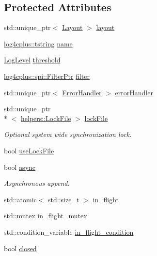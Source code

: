 \subsection*{Protected Attributes}
\begin{DoxyCompactItemize}
\item 
std\-::unique\-\_\-ptr$<$ \hyperlink{classlog4cplus_1_1Layout}{Layout} $>$ \hyperlink{classlog4cplus_1_1Appender_a54860ac05a751b1c3537458edc57b84a}{layout}
\item 
\hyperlink{namespacelog4cplus_a3c9287f6ebcddc50355e29d71152117b}{log4cplus\-::tstring} \hyperlink{classlog4cplus_1_1Appender_a7396e57f462275efb5c4050ef76230b2}{name}
\item 
\hyperlink{namespacelog4cplus_abd332cc8c98fefcbbdcf57b6b3867de9}{Log\-Level} \hyperlink{classlog4cplus_1_1Appender_ac5c52f4dd571d2347a8ec7fc9aa7cedd}{threshold}
\item 
\hyperlink{namespacelog4cplus_1_1spi_abfdea757523ce8fe4598502a29bc7545}{log4cplus\-::spi\-::\-Filter\-Ptr} \hyperlink{classlog4cplus_1_1Appender_a1eb5991691361dac62811a506b158bb7}{filter}
\item 
std\-::unique\-\_\-ptr$<$ \hyperlink{classlog4cplus_1_1ErrorHandler}{Error\-Handler} $>$ \hyperlink{classlog4cplus_1_1Appender_a4a177c2a1ad2aa5945aeac1bd83cfc84}{error\-Handler}
\item 
std\-::unique\-\_\-ptr\\*
$<$ \hyperlink{classlog4cplus_1_1helpers_1_1LockFile}{helpers\-::\-Lock\-File} $>$ \hyperlink{classlog4cplus_1_1Appender_aba357bf52f47fa29747015e421ce6c92}{lock\-File}
\begin{DoxyCompactList}\small\item\em Optional system wide synchronization lock. \end{DoxyCompactList}\item 
bool \hyperlink{classlog4cplus_1_1Appender_a448f8d2e3bf631b1c557e1da8f58fbbb}{use\-Lock\-File}
\item 
bool \hyperlink{classlog4cplus_1_1Appender_a17fc7bbd021d3c7c23ac78de2c4184d8}{async}
\begin{DoxyCompactList}\small\item\em Asynchronous append. \end{DoxyCompactList}\item 
std\-::atomic$<$ std\-::size\-\_\-t $>$ \hyperlink{classlog4cplus_1_1Appender_a0fa717108bb6f918c5671ec697e71bb8}{in\-\_\-flight}
\item 
std\-::mutex \hyperlink{classlog4cplus_1_1Appender_a02d36e4e8e82d352341cd5115f32cc0c}{in\-\_\-flight\-\_\-mutex}
\item 
std\-::condition\-\_\-variable \hyperlink{classlog4cplus_1_1Appender_a51e410648dd416ae749371e433482106}{in\-\_\-flight\-\_\-condition}
\item 
bool \hyperlink{classlog4cplus_1_1Appender_a73bd088d54955fd0153c74644e2b944c}{closed}
\end{DoxyCompactItemize}
